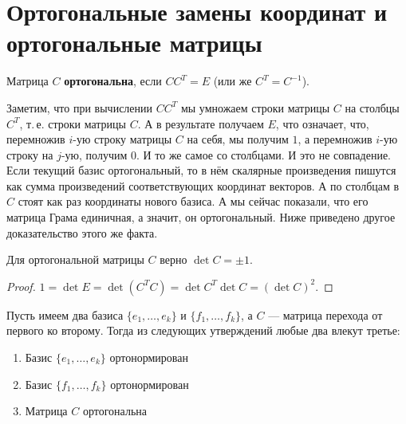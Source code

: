 \section{Ортогональные замены координат и ортогональные матрицы}

\begin{definition}
    Матрица $C$ \textbf{ортогональна}, если $CC^T = E$ (или же $C^T = C^{-1}$).
\end{definition}

Заметим, что при вычислении $CC^T$ мы умножаем строки матрицы $C$ на столбцы $C^T$, т.\,е. строки матрицы $C$. А в результате получаем $E$, что означает, что, перемножив $i$-ую строку матрицы $C$ на себя, мы получим $1$, а перемножив $i$-ую строку на $j$-ую, получим $0$. И то же самое со столбцами. И это не совпадение. Если текущий базис ортогональный, то в нём скалярные произведения пишутся как сумма произведений соответствующих координат векторов. А по столбцам в $C$ стоят как раз координаты нового базиса. А мы сейчас показали, что его матрица Грама единичная, а значит, он ортогональный. Ниже приведено другое доказательство этого же факта.

\begin{statement}
    Для ортогональной матрицы $C$ верно $\det C = \pm 1$.
\end{statement}

\begin{proof}
    $1 = \det E = \det(C^TC) = \det C^T \det C = (\det C)^2$.
\end{proof}

\begin{theorem}
    Пусть имеем два базиса $\{e_1, \ldots, e_k\}$ и $\{f_1, \ldots, f_k\}$, а $C$ --- матрица перехода от первого ко второму. Тогда из следующих утверждений любые два влекут третье:
    \begin{enumerate}
        \item Базис $\{e_1, \ldots, e_k\}$ ортонормирован
        \item Базис $\{f_1, \ldots, f_k\}$ ортонормирован
        \item Матрица $C$ ортогональна
    \end{enumerate}
\end{theorem}

